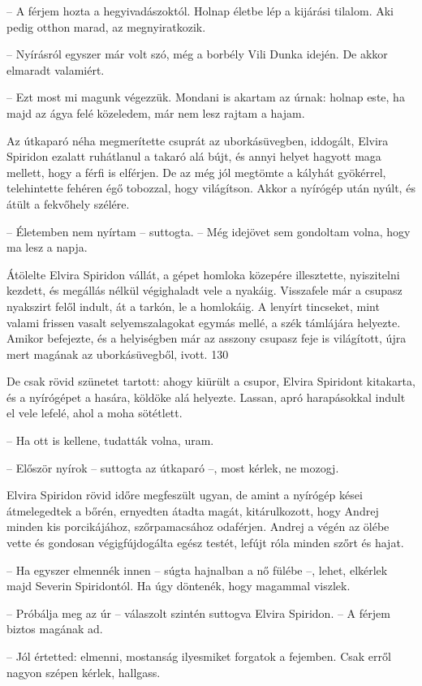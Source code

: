 \documentclass{IEEEtran}
\begin{document}
– A férjem hozta a hegyivadászoktól. Holnap életbe lép a kijárási tilalom. Aki
pedig otthon marad, az megnyiratkozik.

– Nyírásról egyszer már volt szó, még a borbély Vili Dunka idején. De akkor
elmaradt valamiért.

– Ezt most mi magunk végezzük. Mondani is akartam az úrnak: holnap este, ha
majd az ágya felé közeledem, már nem lesz rajtam a hajam.

Az útkaparó néha megmerítette csuprát az uborkásüvegben, iddogált, Elvira
Spiridon ezalatt ruhátlanul a takaró alá bújt, és annyi helyet hagyott maga
mellett, hogy a férfi is elférjen. De az még jól megtömte a kályhát gyökérrel,
telehintette fehéren égő tobozzal, hogy világítson. Akkor a nyírógép után
nyúlt, és átült a fekvőhely szélére.

– Életemben nem nyírtam – suttogta. – Még idejövet sem gondoltam volna, hogy
ma lesz a napja.

Átölelte Elvira Spiridon vállát, a gépet homloka közepére illesztette,
nyiszitelni kezdett, és megállás nélkül végighaladt vele a nyakáig. Visszafele
már a csupasz nyakszirt felől indult, át a tarkón, le a homlokáig. A lenyírt
tincseket, mint valami frissen vasalt selyemszalagokat egymás mellé, a szék
támlájára helyezte. Amikor befejezte, és a helyiségben már az asszony csupasz
feje is világított, újra mert magának az uborkásüvegből, ivott.
130

De csak rövid szünetet tartott: ahogy kiürült a csupor, Elvira Spiridont
kitakarta, és a nyírógépet a hasára, köldöke alá helyezte. Lassan, apró
harapásokkal indult el vele lefelé, ahol a moha sötétlett.

– Ha ott is kellene, tudatták volna, uram.

– Először nyírok – suttogta az útkaparó –, most kérlek, ne mozogj.

Elvira Spiridon rövid időre megfeszült ugyan, de amint a nyírógép kései
átmelegedtek a bőrén, ernyedten átadta magát, kitárulkozott, hogy Andrej
minden kis porcikájához, szőrpamacsához odaférjen. Andrej a végén az ölébe
vette és gondosan végigfújdogálta egész testét, lefújt róla minden szőrt és
hajat.

– Ha egyszer elmennék innen – súgta hajnalban a nő fülébe –, lehet, elkérlek
majd Severin Spiridontól. Ha úgy döntenék, hogy magammal viszlek.

– Próbálja meg az úr – válaszolt szintén suttogva Elvira Spiridon. – A férjem
biztos magának ad.

– Jól értetted: elmenni, mostanság ilyesmiket forgatok a fejemben. Csak erről
nagyon szépen kérlek, hallgass.
\end{document}
